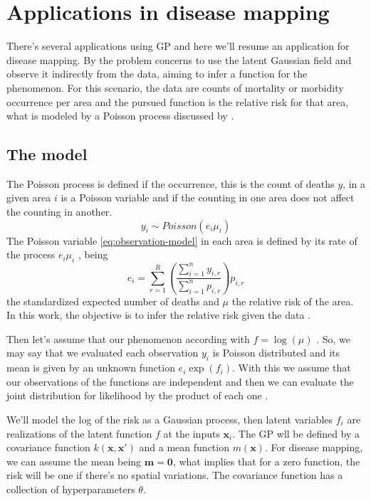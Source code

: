 \section{Applications in disease mapping}
There's several applications using GP and here we'll resume an application for disease mapping. By \cite{Vanhatalo2010Vehtari} the problem concerns to use the latent Gaussian field and observe it indirectly from the data, aiming to infer a function for the phenomenon. For this scenario, the data are counts of mortality or morbidity occurrence per area and the pursued function is the relative risk for that area, what is modeled by a Poisson process discussed by \cite{Best2005}.

\subsection{The model}

The Poisson process is defined if the occurrence, this is the count of deaths $y$, in a given area $i$ is a Poisson variable and if the counting in one area does not affect the counting in another. 
%
\begin{equation}
    y_i \sim Poisson(e_i\mu_i)
    \label{eq:observation-model}
\end{equation}
%
The Poisson variable \eqref{eq:observation-model} in each area is defined by its rate of the process $e_i\mu_i$ \cite{Best2005,Samat2012}, being 
%
\begin{equation}
    e_{i}=\sum_{r=1}^{R}\left(\frac{\sum_{i=1}^{n} y_{i, r}}{\sum_{i=1}^{n} p_{i, r}}\right) p_{i, r}
    \label{eq:standized-num-death}
\end{equation}
%
the standardized expected number of deaths and $\mu$ the relative risk of the area. In this work, the objective is to infer the relative risk given the data \cite{lawson2013statistical}. 

Then let's assume that our phenomenon according with $f=\log (\mu)$ \cite{Best2005}. So, we may say that we evaluated each observation $y_i$ is Poisson distributed and its mean is given by an unknown function $e_i \exp(f_i)$. With this we assume that our observations of the functions are independent and then we can evaluate the joint distribution for likelihood by the product of each one \cite{jarno2010}.

We'll model the log of the risk as a Gaussian process, then latent variables $f_i$ are realizations of the latent function $f$ at the inputs $\mathbf{x}_i$. The GP wll be defined by a covariance function $k(\mathbf{x},\mathbf{x}')$ and a mean function $m(\mathbf{x})$. For disease mapping, we can assume the mean being $\mathbf{m}=\mathbf{0}$, what implies that for a zero function, the risk will be one if there's no spatial variations. The covariance function has a collection of hyperparameters $\theta$.

